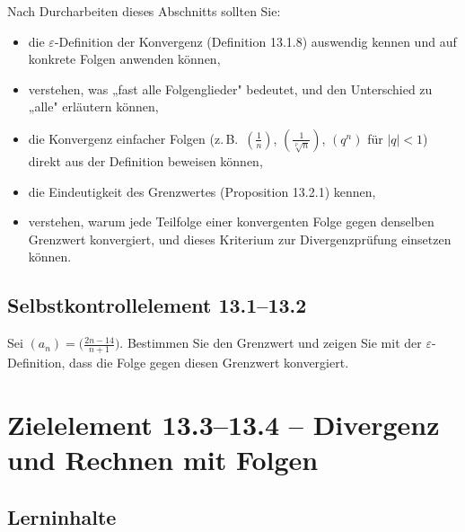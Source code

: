 \documentclass[a4paper,12pt]{article}
\begin{document}
Nach Durcharbeiten dieses Abschnitts sollten Sie:
\begin{itemize}
  \item die $\varepsilon$-Definition der Konvergenz (Definition 13.1.8) auswendig kennen
        und auf konkrete Folgen anwenden können,
  \item verstehen, was „fast alle Folgenglieder" bedeutet, und den Unterschied
        zu „alle" erläutern können,
  \item die Konvergenz einfacher Folgen (z.\,B.\ $(\tfrac{1}{n})$, $(\tfrac{1}{\sqrt[p]{n}})$,
        $(q^n)$ für $|q|<1$) direkt aus der Definition beweisen können,
  \item die Eindeutigkeit des Grenzwertes (Proposition 13.2.1) kennen,
  \item verstehen, warum jede Teilfolge einer konvergenten Folge gegen denselben
        Grenzwert konvergiert, und dieses Kriterium zur Divergenzprüfung einsetzen können.
\end{itemize}

\subsection*{Selbstkontrollelement 13.1--13.2}

Sei $(a_n) = \bigl(\tfrac{2n-14}{n+1}\bigr)$. Bestimmen Sie den Grenzwert und zeigen Sie
mit der $\varepsilon$-Definition, dass die Folge gegen diesen Grenzwert konvergiert.

\newpage

\section*{Zielelement 13.3--13.4 -- Divergenz und Rechnen mit Folgen}

\subsection*{Lerninhalte}
\end{document}

